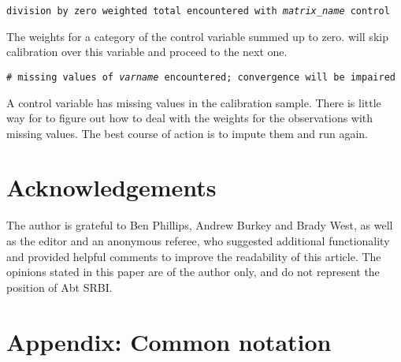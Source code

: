     \noindent
    {\tt division by zero weighted total encountered with
    {\it matrix{\_}name} control}

    \morehang
    The weights for a category of the control variable summed up
    to zero.  will skip calibration over this
    variable and proceed to the next one.

    \noindent
    {\tt \# missing values of {\it varname} encountered; convergence will be impaired}

    \morehang
    A control variable has missing values in the calibration sample.
    There is little way for  to figure out how to deal
    with the weights for the observations with missing values. The best course
    of action is to impute them and run  again.


\section*{Acknowledgements}

The author is grateful to Ben Phillips, Andrew Burkey and Brady West,
as well as the editor and an anonymous referee,
who suggested additional functionality and provided helpful comments 
to improve the readability of this article. The opinions stated in this paper
are of the author only, and do not represent the position of Abt SRBI.


% 


\appendix

\section*{Appendix: Common notation}

